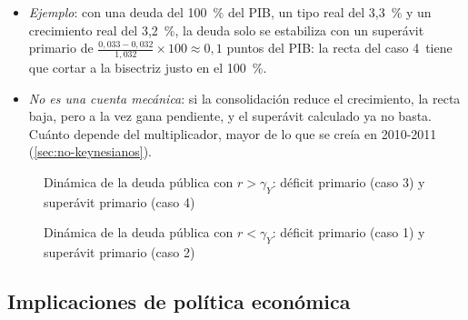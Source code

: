 \documentclass[11pt]{article}
\begin{document}
\begin{itemize}
\begin{enumerate}
  \end{enumerate}
  Los casos que importan son el 3 (de dónde viene una crisis de deuda) y el 4 (lo que hay que hacer para evitarla).
\item \emph{Ejemplo}: con una deuda del 100~\% del PIB, un tipo real del 3,3~\% y un crecimiento real del 3,2~\%, la deuda solo se estabiliza con un superávit primario de $\frac{0{,}033-0{,}032}{1{,}032}\times100\approx0{,}1$ puntos del PIB: la recta del caso 4~tiene que cortar a la bisectriz justo en el 100~\%.
\item \emph{No es una cuenta mecánica}: si la consolidación reduce el crecimiento, la recta baja, pero a la vez gana pendiente, y el superávit calculado ya no basta. Cuánto depende del multiplicador, mayor de lo que se creía en 2010-2011 (\ref{sec:no-keynesianos})\nocite{BlanchardLeigh2013Growth}.
\end{itemize}

\begin{figure}[H]
\centering
\caption{Dinámica de la deuda pública con $r>\gamma_Y$: déficit primario (caso 3) y superávit primario (caso 4)}\label{fig:dinamica-deuda}
\end{figure}

\begin{figure}[H]
\centering
\caption{Dinámica de la deuda pública con $r<\gamma_Y$: déficit primario (caso 1) y superávit primario (caso 2)}\label{fig:dinamica-deuda-r-menor}
\end{figure}

\subsection{Implicaciones de política económica}\label{sec:implicaciones}
\end{document}

